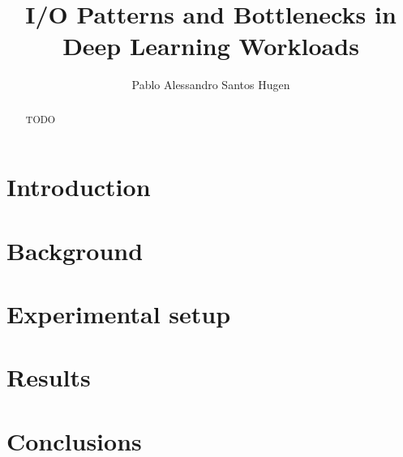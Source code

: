 \documentclass[acmsmall,natbib=false]{template/acmart}
\begin{document}
\title{I/O Patterns and Bottlenecks in Deep Learning Workloads}

\author{Pablo Alessandro Santos Hugen}

\renewcommand{\shortauthors}{Trovato et al.}

\begin{abstract}
	TODO
\end{abstract}


\keywords{}

\maketitle

\section{Introduction}\label{sec:intro}





\section{Background}\label{sec:background}



\section{Experimental setup}\label{sec:methods}




\section{Results}\label{sec:results}



\section{Conclusions}\label{sec:results}



\printbibliography
\appendix
\end{document}

